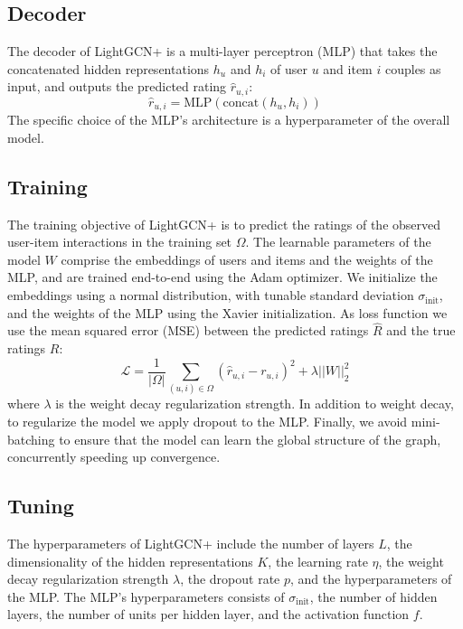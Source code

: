 \documentclass[10pt,conference,compsocconf]{IEEEtran}
\begin{document}
\subsection{Decoder}
The decoder of LightGCN+ is a multi-layer perceptron (MLP) that takes the concatenated hidden representations $h_u$ and $h_i$ of user $u$ and item $i$ couples as input, and outputs the predicted rating $\hat{r}_{u,i}$:
\begin{equation}
    \hat{r}_{u,i} = \text{MLP}(\text{concat}(h_u, h_i))
\end{equation}
The specific choice of the MLP's architecture is a hyperparameter of the overall model.

\subsection{Training}
The training objective of LightGCN+ is to predict the ratings of the observed user-item interactions in the training set $\Omega$.
The learnable parameters of the model $W$ comprise the embeddings of users and items and the weights of the MLP, and are trained end-to-end using the Adam optimizer.
We initialize the embeddings using a normal distribution, with tunable standard deviation $\sigma_{\text{init}}$, and the weights of the MLP using the Xavier initialization.
As loss function we use the mean squared error (MSE) between the predicted ratings $\hat{R}$ and the true ratings $R$:
\begin{equation}
    \mathcal{L} = \frac{1}{|\Omega|} \sum_{(u,i) \in \Omega} (\hat{r}_{u,i} - r_{u,i})^2 + \lambda ||W||_2^2
\end{equation}
where $\lambda$ is the weight decay regularization strength.
In addition to weight decay, to regularize the model we apply dropout to the MLP.
Finally, we avoid mini-batching to ensure that the model can learn the global structure of the graph, concurrently speeding up convergence.

\subsection{Tuning}
The hyperparameters of LightGCN+ include the number of layers $L$, the dimensionality of the hidden representations $K$, the learning rate $\eta$, the weight decay regularization strength $\lambda$, the dropout rate $p$, and the hyperparameters of the MLP.
The MLP's hyperparameters consists of $\sigma_{\text{init}}$, the number of hidden layers, the number of units per hidden layer, and the activation function $f$.
\end{document}
